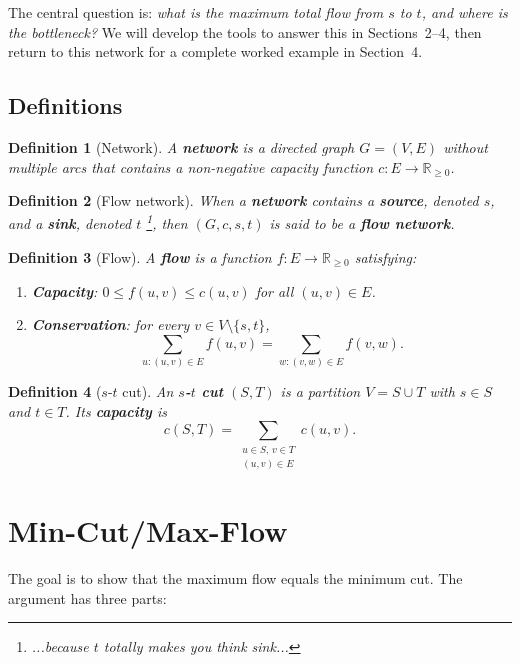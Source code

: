 \documentclass[11pt]{article}
\newtheorem{definition}{Definition}
\begin{document}
The central question is: \emph{what is the maximum total flow
from $s$ to $t$, and where is the bottleneck?}  We will develop
the tools to answer this in Sections~2--4, then return to this
network for a complete worked example in Section~4.

\subsection{Definitions}

\begin{definition}[Network]
A \textbf{network} is a directed graph $G = (V, E)$ without multiple arcs that contains a
non-negative capacity function $c : E \to \mathbb{R}_{\ge 0}$.
\end{definition}

\begin{definition}[Flow network]
When a \textbf{network} contains a \textbf{source}, denoted $s$, and a \textbf{sink}, denoted $t$ \footnote{...because $t$ totally makes you think sink...}, then $(G, c, s, t)$ is said to be a \textbf{flow network}.
\end{definition}

\begin{definition}[Flow]
A \textbf{flow} is a function $f : E \to \mathbb{R}_{\ge 0}$
satisfying:
\begin{enumerate}
  \item \textbf{Capacity}: $0 \le f(u,v) \le c(u,v)$ for all
        $(u,v) \in E$.
  \item \textbf{Conservation}: for every
        $v \in V \setminus \{s,t\}$,
        \[
          \sum_{u:(u,v)\in E} f(u,v)
          = \sum_{w:(v,w)\in E} f(v,w).
        \]
\end{enumerate}
\end{definition}

\begin{definition}[$s$-$t$ cut]
An \textbf{$s$-$t$ cut} $(S, T)$ is a partition $V = S \cup T$
with $s \in S$ and $t \in T$.  Its \textbf{capacity} is
\[
  c(S,T) = \sum_{\substack{u \in S,\, v \in T \\ (u,v) \in E}}
           c(u,v).
\]
\end{definition}

\section{Min-Cut/Max-Flow}

The goal is to show that the maximum flow equals the minimum
cut.  The argument has three parts:
\end{document}
